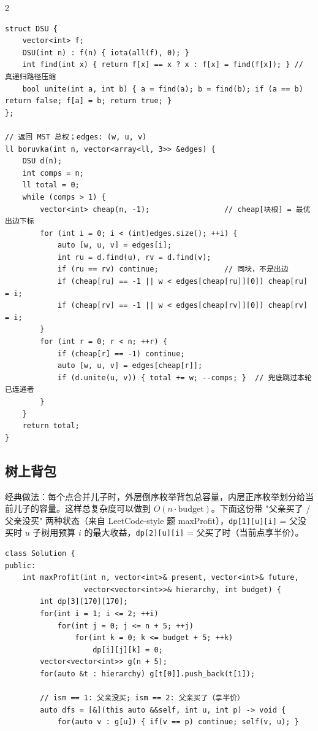 \begin{multicols*}{2}
		\begin{verbatim}
struct DSU {
    vector<int> f;
    DSU(int n) : f(n) { iota(all(f), 0); }
    int find(int x) { return f[x] == x ? x : f[x] = find(f[x]); } // 真递归路径压缩
    bool unite(int a, int b) { a = find(a); b = find(b); if (a == b) return false; f[a] = b; return true; }
};

// 返回 MST 总权；edges: (w, u, v)
ll boruvka(int n, vector<array<ll, 3>> &edges) {
    DSU d(n);
    int comps = n;
    ll total = 0;
    while (comps > 1) {
        vector<int> cheap(n, -1);                 // cheap[块根] = 最优出边下标
        for (int i = 0; i < (int)edges.size(); ++i) {
            auto [w, u, v] = edges[i];
            int ru = d.find(u), rv = d.find(v);
            if (ru == rv) continue;               // 同块，不是出边
            if (cheap[ru] == -1 || w < edges[cheap[ru]][0]) cheap[ru] = i;
            if (cheap[rv] == -1 || w < edges[cheap[rv]][0]) cheap[rv] = i;
        }
        for (int r = 0; r < n; ++r) {
            if (cheap[r] == -1) continue;
            auto [w, u, v] = edges[cheap[r]];
            if (d.unite(u, v)) { total += w; --comps; }  // 兜底跳过本轮已连通者
        }
    }
    return total;
}
		\end{verbatim}


		\subsection{树上背包}

		经典做法：每个点合并儿子时，外层倒序枚举背包总容量，内层正序枚举划分给当前儿子的容量。这样总复杂度可以做到 $O(n \cdot \mathrm{budget})$。下面这份带 "父亲买了 / 父亲没买" 两种状态（来自 LeetCode-style 题 maxProfit），\texttt{dp[1][u][i]} = 父没买时 $u$ 子树用预算 $i$ 的最大收益，\texttt{dp[2][u][i]} = 父买了时（当前点享半价）。

		\begin{verbatim}
class Solution {
public:
    int maxProfit(int n, vector<int>& present, vector<int>& future,
                  vector<vector<int>>& hierarchy, int budget) {
        int dp[3][170][170];
        for(int i = 1; i <= 2; ++i)
            for(int j = 0; j <= n + 5; ++j)
                for(int k = 0; k <= budget + 5; ++k)
                    dp[i][j][k] = 0;
        vector<vector<int>> g(n + 5);
        for(auto &t : hierarchy) g[t[0]].push_back(t[1]);

        // ism == 1: 父亲没买; ism == 2: 父亲买了（享半价）
        auto dfs = [&](this auto &&self, int u, int p) -> void {
            for(auto v : g[u]) { if(v == p) continue; self(v, u); }


\end{verbatim}
\end{multicols*}
